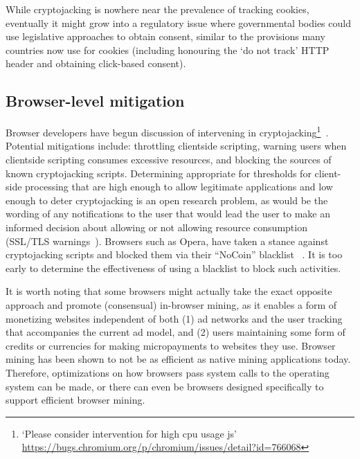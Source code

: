 While cryptojacking is nowhere near the prevalence of tracking cookies, eventually it might grow into a regulatory issue where governmental bodies could use legislative approaches to obtain consent, similar to the provisions many countries now use for cookies (including honouring the `do not track' HTTP header and obtaining click-based consent).


\subsection{Browser-level mitigation}

Browser developers have begun discussion of intervening in cryptojacking\footnote{`Please consider intervention for high cpu usage js' \url{https://bugs.chromium.org/p/chromium/issues/detail?id=766068}}~\cite{operanocoin}. Potential mitigations include: throttling clientside scripting, warning users when clientside scripting consumes excessive resources, and blocking the sources of known cryptojacking scripts. Determining appropriate for thresholds for client-side processing that are high enough to allow legitimate applications and low enough to deter cryptojacking is an open research problem, as would be the wording of any notifications to the user that would lead the user to make an informed decision about allowing or not allowing resource consumption (\cf SSL/TLS warnings~\cite{SEAAC09,SHB11,Acer:2017:WWR:3133956.3134007}).
Browsers such as Opera, have taken a stance against cryptojacking scripts and blocked them via their ``NoCoin'' blacklist ~\cite{operanocoin}. It is too early to determine the effectiveness of using a blacklist to block such activities.  

It is worth noting that some browsers might actually take the exact opposite approach and promote (consensual) in-browser mining, as it enables a form of monetizing websites independent of both (1) ad networks and the user tracking that accompanies the current ad model, and (2) users maintaining some form of credits or currencies for making micropayments to websites they use. Browser mining has been shown to not be as efficient as native mining applications today. Therefore, optimizations on how browsers pass system calls to the operating system can be made, or there can even be browsers designed specifically to support efficient browser mining. 


